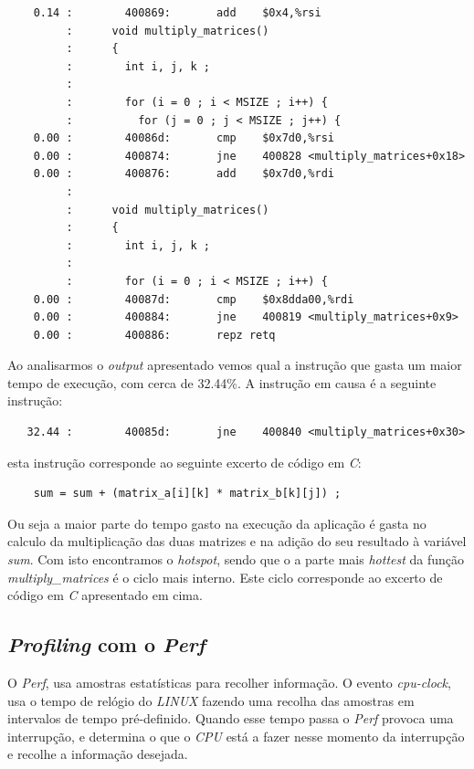 \documentclass[conference,compsoc]{IEEEtran}
\begin{document}
\begin{lstlisting}
    0.14 :        400869:       add    $0x4,%rsi
         :      void multiply_matrices()
         :      {
         :        int i, j, k ;
         :       
         :        for (i = 0 ; i < MSIZE ; i++) {
         :          for (j = 0 ; j < MSIZE ; j++) {
    0.00 :        40086d:       cmp    $0x7d0,%rsi
    0.00 :        400874:       jne    400828 <multiply_matrices+0x18>
    0.00 :        400876:       add    $0x7d0,%rdi
         :       
         :      void multiply_matrices()
         :      {
         :        int i, j, k ;
         :       
         :        for (i = 0 ; i < MSIZE ; i++) {
    0.00 :        40087d:       cmp    $0x8dda00,%rdi
    0.00 :        400884:       jne    400819 <multiply_matrices+0x9>
    0.00 :        400886:       repz retq
\end{lstlisting}

Ao analisarmos o \textit{output} apresentado vemos qual a instrução que gasta um maior tempo de execução, com cerca de 32.44\%. A instrução em causa é a seguinte instrução:

\begin{lstlisting}
   32.44 :        40085d:       jne    400840 <multiply_matrices+0x30>
\end{lstlisting}

esta instrução corresponde ao seguinte excerto de código em \textit{C}:

\begin{lstlisting}
	sum = sum + (matrix_a[i][k] * matrix_b[k][j]) ;
\end{lstlisting}

Ou seja a maior parte do tempo gasto na execução da aplicação é gasta no calculo da multiplicação das duas matrizes e na adição do seu resultado à variável \textit{sum}. Com isto encontramos o \textit{hotspot}, sendo que o a parte mais \textit{hottest} da função \textit{multiply\_matrices} é o ciclo mais interno. Este ciclo corresponde ao excerto de código em \textit{C} apresentado em cima.

\subsection{\textit{Profiling} com o \textit{Perf}}

O \textit{Perf}, usa amostras estatísticas para recolher informação. O evento \textit{cpu-clock}, usa o tempo de relógio do \textit{LINUX} fazendo uma recolha das amostras em intervalos de tempo pré-definido. Quando esse tempo passa o \textit{Perf} provoca uma interrupção, e determina o que o \textit{CPU} está a fazer nesse momento da interrupção e recolhe a informação desejada.
\end{document}
